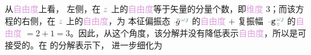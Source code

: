 从\textcolor{Plum}{自由度}上看， 左侧，在 $\mathcolor{gray}{z}$ 上的\textcolor{Plum}{自由度}等于矢量的分量个数，即\textcolor{Plum}{维度} 3；而该方程的右侧，在 $\mathcolor{gray}{z}$ 上的\textcolor{Plum}{自由度}，为 \textcolor{PineGreen}{本征偏振态} $\Xint{{}^{}_{\mathcolor{gray}{-}}}{10}{\bar{g}}^{\;\!\mathcolor{gray}{\omega} \textcolor{PineGreen}{\jmath}}$ 的\textcolor{Plum}{自由度} $+$ \textcolor{PineGreen}{复振幅} $\Xint{\begin{smallmatrix} ~ \\ {}^{}_{\mathcolor{gray}{-}} \\ ~ \end{smallmatrix}}{09}{\mathtt{g}}^{\;\!\mathcolor{gray}{\omega} \textcolor{PineGreen}{\jmath}}_{\;\! \mathcolor{gray}{z}}$ 的\textcolor{Plum}{自由度} $= 2 + 1 = 3$。因此，从这个角度，该分解并没有降低表示\textcolor{Plum}{自由度}，所以是可接受的。在  的分解表示下， 进一步细化为

